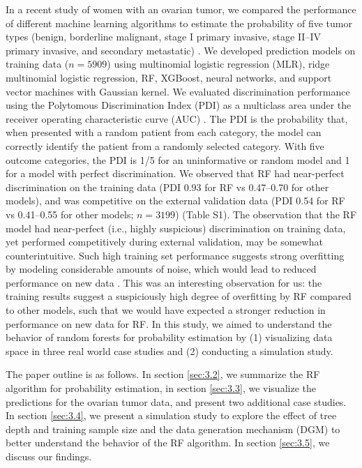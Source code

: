 In a recent study of women with an ovarian tumor, we compared the performance of
different machine learning algorithms to estimate the probability of five tumor
types (benign, borderline malignant, stage I primary invasive, stage II--IV
primary invasive, and secondary metastatic)
 \cite{ledgerMulticlassRiskModels2023}. We developed prediction models on
training data ($n = 5909$) using multinomial logistic regression (\gls{MLR}), ridge
multinomial logistic regression, \gls{RF}, XGBoost, neural networks, and support
vector machines with Gaussian kernel. We evaluated discrimination performance
using the Polytomous Discrimination Index (\gls{PDI}) as a multiclass area under the
receiver operating characteristic curve (\gls{AUC})
 \cite{vancalsterExtendingCstatisticNominal2012,doverComputingPolytomousDiscrimination2021}.
The \gls{PDI} is the probability that, when presented with a random patient from each
category, the model can correctly identify the patient from a randomly selected
category. With five outcome categories, the \gls{PDI} is 1/5 for an uninformative or
random model and 1 for a model with perfect discrimination. We observed that \gls{RF}
had near-perfect discrimination on the training data (\gls{PDI} 0.93 for \gls{RF} vs
0.47--0.70 for other models), and was competitive on the external validation
data (\gls{PDI} 0.54 for \gls{RF} vs 0.41--0.55 for other models; $n = 3199$) (Table S1).
The observation that the \gls{RF} model had near-perfect (i.e., highly suspicious)
discrimination on training data, yet performed competitively during external
validation, may be somewhat counterintuitive. Such high training set performance
suggests strong overfitting by modeling considerable amounts of noise, which
would lead to reduced performance on new data
 \cite{hastieElementsStatisticalLearning2001,steyerberg2019clinical}.
This was an interesting observation for us: the training results suggest a
suspiciously high degree of overfitting by \gls{RF} compared to other models, such
that we would have expected a stronger reduction in performance on new data for
\gls{RF}. In this study, we aimed to understand the behavior of random forests for
probability estimation by (1) visualizing data space in three real world case
studies and (2) conducting a simulation study.

The paper outline is as follows. In section \ref{sec:3.2}, we summarize the \gls{RF} algorithm for probability estimation,
in section \ref{sec:3.3}, we visualize the predictions for the ovarian
tumor data, and present two additional case studies. In section \ref{sec:3.4}, we present a simulation study to explore the effect of tree depth and
training sample size and the data generation mechanism (\gls{DGM}) to better
understand the behavior of the \gls{RF} algorithm. In
section \ref{sec:3.5}, we discuss our findings.


